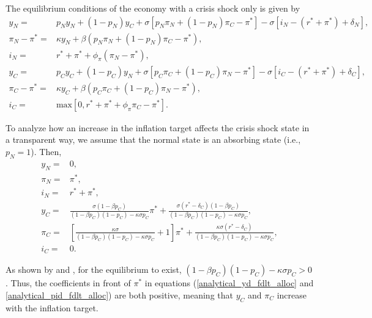 \documentclass[11pt]{article}
\begin{document}
\begin{singlespace}
		The equilibrium conditions of the economy with a crisis shock only is given by
		\begin{align}
			y_{N} =& p_{N} y_{N} + (1-p_{N})y_C +  \sigma\left[p_{N} \pi_{N} + (1-p_{N})\pi_C - \pi^*\right] -\sigma\left[i_{N} - (r^* + \pi^*) + \delta_{N}\right] \label{ee_fdlt},\\
			\pi_{N} - \pi^*=& \kappa y_{N} + \beta\left(p_{N} \pi_{N} + (1-p_{N})\pi_C - \pi^*\right),\\
			i_{N} =& r^* + \pi^* + \phi_{\pi}(\pi_{N}-\pi^*),\\
			y_{C} =& p_C y_C + (1-p_C)y_{N} +  \sigma\left[p_C \pi_C + (1-p_C)\pi_{N} - \pi^*\right] - \sigma\left[i_C - (r^* + \pi^*)+ \delta_C\right],\\
			\pi_{C} - \pi^* =& \kappa y_C + \beta\left(p_C \pi_C + (1-p_C)\pi_{N} - \pi^*\right),\\
			i_C =&  \text{max}\left[0,r^* + \pi^*  + \phi_{\pi}\pi_C - \pi^*\right]. \label{i_fdlt}
		\end{align}
		
		
		
		To analyze how an increase in the inflation target affects the crisis shock state in a transparent way, we assume that the normal state is an absorbing state (i.e., $p_{N}=1$). Then,
		\begin{align}
			y_{N} =& 0,  \\
			\pi_{N} =& \pi^*, \\
			i_{N} =& r^* + \pi^*,  \\
			y_C =& \frac{\sigma(1-\beta p_C)}{(1-\beta p_C)(1-p_C) -\kappa\sigma p_C}\pi^{*} + \frac{\sigma ( r^*-\delta_C )(1-\beta p_C)}{(1-\beta p_C)(1-p_C) -\kappa\sigma p_C},  \label{analytical_yd_fdlt_alloc}\\
			\pi_C =& \left[\frac{\kappa\sigma}{(1-\beta p_C)(1-p_C) -\kappa\sigma p_C} + 1\right]\pi^*+\frac{\kappa\sigma(r^* - \delta_C)}{(1-\beta p_C)(1-p_C) -\kappa\sigma p_C},\label{analytical_pid_fdlt_alloc}\\
			i_C =& 0.
		\end{align}
		
		\noindent As shown by \citet{NakataSchmidtForthcomingJME} and \citet{NakataSchmidt2019}, for the equilibrium to exist, $(1-\beta p_C)(1-p_C) -\kappa\sigma p_C >0$. Thus, the coefficients in front of $\pi^*$ in equations (\ref{analytical_yd_fdlt_alloc} and \ref{analytical_pid_fdlt_alloc}) are both positive, meaning that $y_C$ and $\pi_C$ increase with the inflation target. 
		

\end{singlespace}
\end{document}
